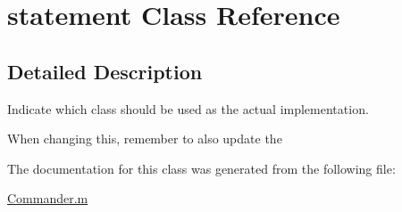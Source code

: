 \hypertarget{classstatement}{
\section{statement Class Reference}
\label{classstatement}
}


\subsection{Detailed Description}
Indicate which class should be used as the actual implementation.

When changing this, remember to also update the 

The documentation for this class was generated from the following file:\begin{DoxyCompactItemize}
\item 
\hyperlink{_commander_8m}{Commander.m}\end{DoxyCompactItemize}

